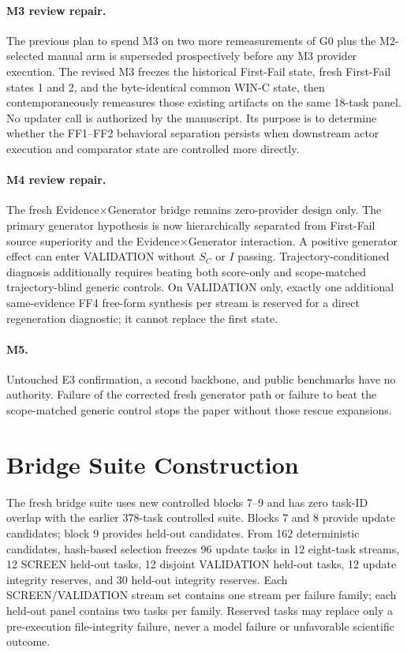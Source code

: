 \paragraph{M3 review repair.}
The previous plan to spend M3 on two more remeasurements of G0 plus the M2-selected manual arm is superseded prospectively before any M3 provider execution. The revised M3 freezes the historical First-Fail state, fresh First-Fail states 1 and 2, and the byte-identical common WIN-C state, then contemporaneously remeasures those existing artifacts on the same 18-task panel. No updater call is authorized by the manuscript. Its purpose is to determine whether the FF1--FF2 behavioral separation persists when downstream actor execution and comparator state are controlled more directly.

\paragraph{M4 review repair.}
The fresh Evidence$\times$Generator bridge remains zero-provider design only. The primary generator hypothesis is now hierarchically separated from First-Fail source superiority and the Evidence$\times$Generator interaction. A positive generator effect can enter VALIDATION without $S_C$ or $I$ passing. Trajectory-conditioned diagnosis additionally requires beating both score-only and scope-matched trajectory-blind generic controls. On VALIDATION only, exactly one additional same-evidence FF4 free-form synthesis per stream is reserved for a direct regeneration diagnostic; it cannot replace the first state.

\paragraph{M5.}
Untouched E3 confirmation, a second backbone, and public benchmarks have no authority. Failure of the corrected fresh generator path or failure to beat the scope-matched generic control stops the paper without those rescue expansions.

\section{Bridge Suite Construction}
\label{app:suite}

The fresh bridge suite uses new controlled blocks 7--9 and has zero task-ID overlap with the earlier 378-task controlled suite. Blocks 7 and 8 provide update candidates; block 9 provides held-out candidates. From 162 deterministic candidates, hash-based selection freezes 96 update tasks in 12 eight-task streams, 12 SCREEN held-out tasks, 12 disjoint VALIDATION held-out tasks, 12 update integrity reserves, and 30 held-out integrity reserves. Each SCREEN/VALIDATION stream set contains one stream per failure family; each held-out panel contains two tasks per family. Reserved tasks may replace only a pre-execution file-integrity failure, never a model failure or unfavorable scientific outcome.
